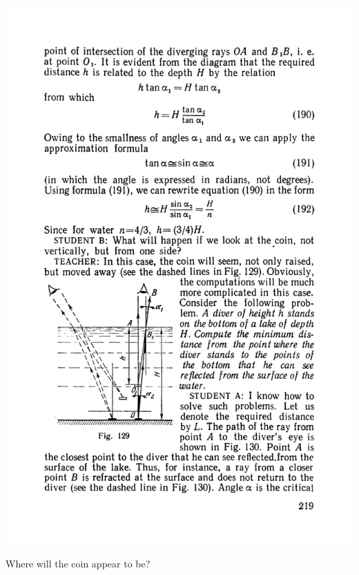 \documentclass[a4paper,sfsidenotes]{tufte-book}
\begin{document}
\begin{marginfigure}%
\centering
\includegraphics[width=.9\linewidth]{fig-129a}
\caption{Where will the coin appear to be?}
\label{fig-129}
\end{marginfigure}
\end{document}
